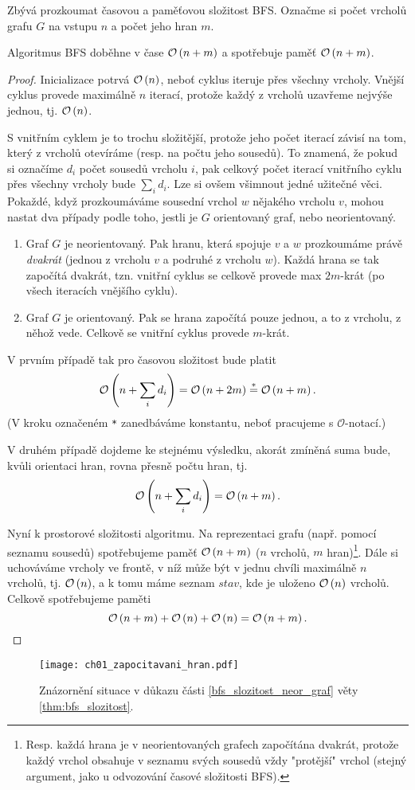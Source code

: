 Zbývá prozkoumat časovou a paměťovou složitost BFS. Označme si počet vrcholů grafu $G$ na vstupu $n$ a počet jeho hran $m$. 
\begin{theorem}\label{thm:bfs_slozitost}
    Algoritmus BFS doběhne v čase $\mathcal{O}\left(n+m\right)$ a spotřebuje paměť $\mathcal{O}\left(n+m\right)$.
\end{theorem}
\begin{proof}
    Inicializace potrvá $\mathcal{O}\left(n\right)$, neboť cyklus iteruje přes všechny vrcholy. Vnější cyklus provede maximálně $n$ iterací, protože každý z vrcholů uzavřeme nejvýše jednou, tj. $\mathcal{O}\left(n\right)$.

    S vnitřním cyklem je to trochu složitější, protože jeho počet iterací závisí na tom, který z vrcholů otevíráme (resp. na počtu jeho sousedů). To znamená, že pokud si označíme $d_i$ počet sousedů vrcholu $i$, pak celkový počet iterací vnitřního cyklu přes všechny vrcholy bude $\sum_i{d_i}$. Lze si ovšem všimnout jedné užitečné věci. Pokaždé, když prozkoumáváme sousední vrchol $w$ nějakého vrcholu $v$, mohou nastat dva případy podle toho, jestli je $G$ orientovaný graf, nebo neorientovaný.
    \begin{enumerate}[label=(\roman*)]
        \item\label{bfs_slozitost_neor_graf} Graf $G$ je neorientovaný. Pak hranu, která spojuje $v$ a $w$ prozkoumáme právě \emph{dvakrát} (jednou z vrcholu $v$ a podruhé z vrcholu $w$). Každá hrana se tak započítá dvakrát, tzn. vnitřní cyklus se celkově provede max $2m$-krát (po všech iteracích vnějšího cyklu).
        \item\label{bfs_slozitost_or_graf} Graf $G$ je orientovaný. Pak se hrana započítá pouze jednou, a to z vrcholu, z něhož vede. Celkově se vnitřní cyklus provede $m$-krát.
    \end{enumerate}
    V prvním případě tak pro časovou složitost bude platit
    \[\mathcal{O}\left(n+\sum_i{d_i}\right)=\mathcal{O}\left(n+2m\right)\stackrel{*}{=}\mathcal{O}\left(n+m\right).\]
    (V kroku označeném \texttt{*} zanedbáváme konstantu, neboť pracujeme s $\mathcal{O}$-notací.)\par
    V druhém případě dojdeme ke stejnému výsledku, akorát zmíněná suma bude, kvůli orientaci hran, rovna přesně počtu hran, tj.
    \[\mathcal{O}\left(n+\sum_i{d_i}\right)=\mathcal{O}\left(n+m\right).\]

    Nyní k prostorové složitosti algoritmu. Na reprezentaci grafu (např. pomocí seznamu sousedů) spotřebujeme paměť $\mathcal{O}\left(n+m\right)$ ($n$ vrcholů, $m$ hran)\footnote{Resp. každá hrana je v neorientovaných grafech započítána dvakrát, protože každý vrchol obsahuje v seznamu svých sousedů vždy "protější" vrchol (stejný argument, jako u odvozování časové složitosti BFS).}. Dále si uchováváme vrcholy ve frontě, v níž může být v jednu chvíli maximálně $n$ vrcholů, tj. $\mathcal{O}\left(n\right)$, a k tomu máme seznam $stav$, kde je uloženo $\mathcal{O}\left(n\right)$ vrcholů. Celkově spotřebujeme paměti
    \[\mathcal{O}\left(n+m\right)+\mathcal{O}\left(n\right)+\mathcal{O}\left(n\right)=\mathcal{O}\left(n+m\right).\]
\end{proof}
\begin{figure}[h]
    \centering
    \texttt{[image: ch01\_zapocitavani\_hran.pdf]}
    \caption{Znázornění situace v důkazu části \ref{bfs_slozitost_neor_graf} věty \ref{thm:bfs_slozitost}.}
\end{figure}